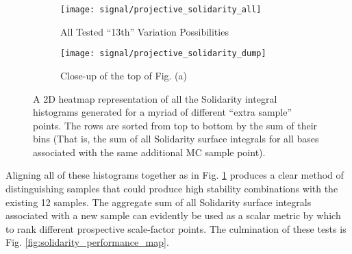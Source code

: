     \begin{figure}[tbh]
        \begin{subfigure}{0.5\textwidth}
            \texttt{[image: signal/projective\_solidarity\_all]}
            \captionsetup{justification=centering} \caption{All Tested ``13th'' Variation Possibilities}
        \end{subfigure}
        \begin{subfigure}{0.5\textwidth}
            \texttt{[image: signal/projective\_solidarity\_dump]}
            \captionsetup{justification=centering} \caption{Close-up of the top of Fig. (a)}
        \end{subfigure}
        \caption{
            A 2D heatmap representation of all the Solidarity integral histograms generated for a myriad of different ``extra sample'' points.
            The rows are sorted from top to bottom by the sum of their bins
                (That is, the sum of all Solidarity surface integrals for all bases associated with the same additional MC sample point).
        }
        \label{fig:solidarity_dump}
    \end{figure}
    \FloatBarrier

    Aligning all of these histograms together as in Fig. \ref{fig:solidarity_dump}
        produces a clear method of distinguishing samples that 
        could produce high stability combinations with the existing 12 samples.
    The aggregate sum of all Solidarity surface integrals associated with a new sample
        can evidently be used as a scalar metric by which to rank different prospective scale-factor points.
    The culmination of these tests is Fig. \ref{fig:solidarity_performance_map}.


